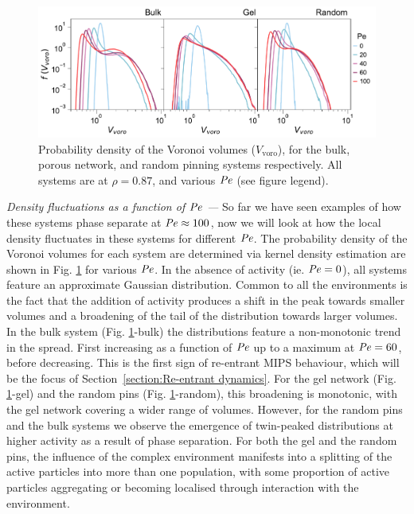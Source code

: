 \begin{figure}
	\centering
	\includegraphics[width=\linewidth]{chapters/activeConfinement/figsActiveConfinement/figVoro_PDF.pdf}
	\caption[Distribution of Voronoi volumes in the three systems]{Probability density of the Voronoi volumes ($V_{\textrm{voro}}$), for the bulk, porous network, and random pinning systems respectively. All systems are at $\rho=0.87$, and various $\operatorname{\mathit{P\kern-.08em e}}$ (see figure legend).}
	\label{fig:figVORO_histograms}
\end{figure}

\textit{Density fluctuations as a function of $\operatorname{\mathit{P\kern-.08em e}}$ ---} So far we have seen examples of how these systems phase separate at $\operatorname{\mathit{P\kern-.08em e}} \approx 100$, now we will look at how the local density fluctuates in these systems for different $\operatorname{\mathit{P\kern-.08em e}}$. The probability density of the Voronoi volumes for each system are determined via kernel density estimation are shown in Fig. \ref{fig:figVORO_histograms} for various $\operatorname{\mathit{P\kern-.08em e}}$. In the absence of activity (ie. $\operatorname{\mathit{P\kern-.08em e}}=0$), all systems feature an approximate Gaussian distribution.
Common to all the environments is the fact that the addition of activity produces a shift in the peak towards smaller volumes and a broadening of the tail of the  distribution towards larger volumes. In the bulk system (Fig. \ref{fig:figVORO_histograms}-bulk) the distributions feature a non-monotonic trend in the spread. First increasing as a function of $\operatorname{\mathit{P\kern-.08em e}}$ up to a maximum at $\operatorname{\mathit{P\kern-.08em e}} = 60$, before decreasing. This is the first sign of re-entrant MIPS behaviour, which will be the focus of Section~\ref{section:Re-entrant dynamics}.
For the gel network (Fig. \ref{fig:figVORO_histograms}-gel) and the random pins (Fig. \ref{fig:figVORO_histograms}-random), this broadening is monotonic, with the gel network covering a wider range of volumes. However, for the random pins and the bulk systems we observe the emergence of twin-peaked distributions at higher activity as a result of phase separation. For both the gel and the random pins, the influence of the complex environment manifests into a splitting of the active particles into more than one population, with some proportion of active particles aggregating or becoming localised through interaction with the environment.

